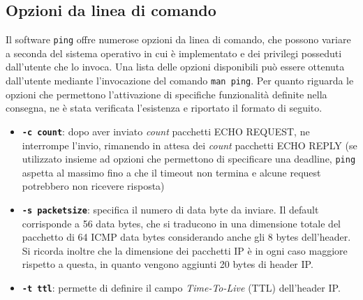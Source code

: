\documentclass[a4paper,10pt]{article}
\begin{document}
\subsection{Opzioni da linea di comando}
Il software \texttt{ping} offre numerose opzioni da linea di comando, che possono variare a seconda del sistema operativo in cui è implementato e dei privilegi posseduti dall'utente che lo invoca. Una lista delle opzioni disponibili può essere ottenuta dall'utente mediante l'invocazione del comando \texttt{man ping}. Per quanto riguarda le opzioni che permettono l'attivazione di specifiche funzionalità definite nella consegna, ne è stata verificata l'esistenza e riportato il formato di seguito.
\begin{itemize}

\item \textbf{\texttt{-c count}}: dopo aver inviato \textit{count} pacchetti ECHO REQUEST, ne interrompe l'invio, rimanendo in attesa dei \textit{count} pacchetti ECHO REPLY (se utilizzato insieme ad opzioni che permettono di specificare una deadline, \texttt{ping} aspetta al massimo fino a che il timeout non termina e alcune request potrebbero non ricevere risposta) 

\item \textbf{\texttt{-s packetsize}}: specifica il numero di data byte da inviare. Il default corrisponde a 56 data bytes, che si traducono in una dimensione totale del pacchetto di 64 ICMP data bytes considerando anche gli 8 bytes dell'header. Si ricorda inoltre che la dimensione dei pacchetti IP è in ogni caso maggiore rispetto a questa, in quanto vengono aggiunti 20 bytes di header IP.

\item \textbf{\texttt{-t ttl}}: permette di definire il campo \textit{Time-To-Live} (TTL) dell'header IP. 

\end{itemize}

\newpage
\end{document}

